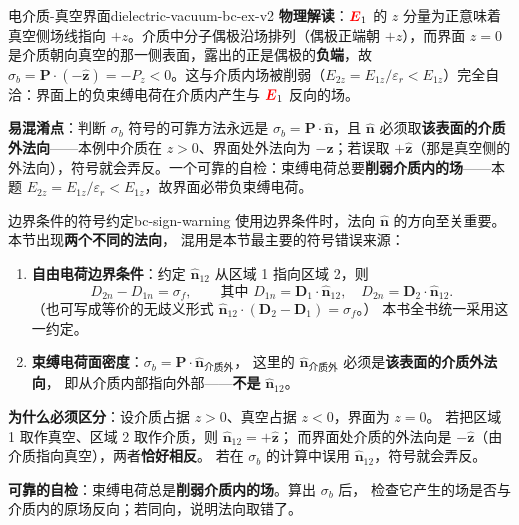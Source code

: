 \documentclass[11pt,a4paper,openany,oneside]{book}
\newcommand{\vecE}{\textcolor{red}{\vect{E}}}
\newcommand{\eps}{\varepsilon}
\newcommand{\vect}[1]{\bm{#1}}
\newcommand{\unitvec}[1]{\hat{\vect{#1}}}
\begin{document}
\begin{example}{电介质-真空界面}{dielectric-vacuum-bc-ex-v2}
\textbf{物理解读}：$\vecE_1$ 的 $z$ 分量为正意味着真空侧场线指向 $+z$。介质中分子偶极沿场排列（偶极正端朝 $+z$），而界面 $z=0$ 是介质朝向真空的那一侧表面，露出的正是偶极的\textbf{负端}，故 $\sigma_b = \vect{P}\cdot(-\unitvec{z}) = -P_z < 0$。这与介质内场被削弱（$E_{2z} = E_{1z}/\eps_r < E_{1z}$）完全自洽：界面上的负束缚电荷在介质内产生与 $\vecE_1$ 反向的场。

\textbf{易混淆点}：判断 $\sigma_b$ 符号的可靠方法永远是 $\sigma_b = \vect{P}\cdot\unitvec{n}$，且 $\unitvec{n}$ 必须取\textbf{该表面的介质外法向}——本例中介质在 $z>0$、界面处外法向为 $-\unitvec{z}$；若误取 $+\unitvec{z}$（那是真空侧的外法向），符号就会弄反。一个可靠的自检：束缚电荷总要\textbf{削弱介质内的场}——本题 $E_{2z} = E_{1z}/\eps_r < E_{1z}$，故界面必带负束缚电荷。
\end{example}

\begin{warning}{边界条件的符号约定}{bc-sign-warning}
使用边界条件时，法向 $\unitvec{n}$ 的方向至关重要。本节出现\textbf{两个不同的法向}，
混用是本节最主要的符号错误来源：

\begin{enumerate}
\item \textbf{自由电荷边界条件}：约定 $\unitvec{n}_{12}$ 从区域 1 指向区域 2，则
\[
D_{2n} - D_{1n} = \sigma_f,\qquad\text{其中 } D_{1n}=\vect{D}_1\cdot\unitvec{n}_{12},\quad D_{2n}=\vect{D}_2\cdot\unitvec{n}_{12}.
\]
（也可写成等价的无歧义形式 $\unitvec{n}_{12}\cdot(\vect{D}_2-\vect{D}_1)=\sigma_f$。）
本书全书统一采用这一约定。
\item \textbf{束缚电荷面密度}：$\sigma_b = \vect{P}\cdot\unitvec{n}_{\text{介质外}}$，
这里的 $\unitvec{n}_{\text{介质外}}$ 必须是\textbf{该表面的介质外法向}，
即从介质内部指向外部——\textbf{不是} $\unitvec{n}_{12}$。
\end{enumerate}

\textbf{为什么必须区分}：设介质占据 $z>0$、真空占据 $z<0$，界面为 $z=0$。
若把区域 1 取作真空、区域 2 取作介质，则 $\unitvec{n}_{12} = +\unitvec{z}$；
而界面处介质的外法向是 $-\unitvec{z}$（由介质指向真空），两者\textbf{恰好相反}。
若在 $\sigma_b$ 的计算中误用 $\unitvec{n}_{12}$，符号就会弄反。

\textbf{可靠的自检}：束缚电荷总是\textbf{削弱介质内的场}。算出 $\sigma_b$ 后，
检查它产生的场是否与介质内的原场反向；若同向，说明法向取错了。
\end{warning}
\end{document}
